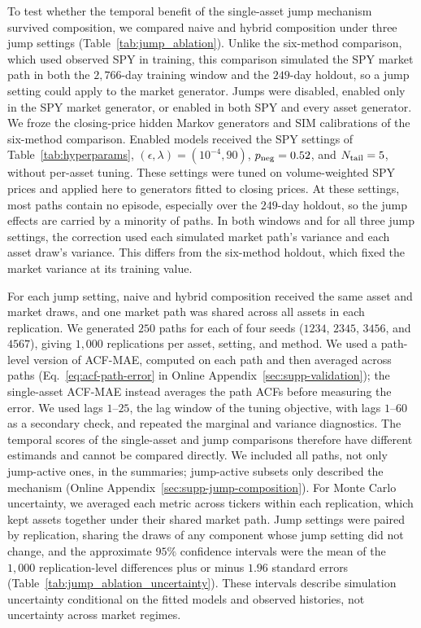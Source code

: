To test whether the temporal benefit of the single-asset jump
mechanism survived composition, we compared naive and hybrid
composition under three jump settings (Table~\ref{tab:jump_ablation}).
Unlike the six-method comparison, which used observed SPY in
training, this comparison simulated the SPY market path in both the
$2{,}766$-day training window and the $249$-day holdout, so a jump
setting could apply to the market generator. Jumps were disabled,
enabled only in the SPY market generator, or enabled in both SPY and
every asset generator. We froze the closing-price hidden Markov generators and SIM
calibrations of the six-method comparison. Enabled models
received the SPY settings of Table~\ref{tab:hyperparams},
$(\epsilon,\lambda)=(10^{-4},90)$, $p_{\rm neg}=0.52$, and
$N_{\rm tail}=5$, without per-asset tuning. These settings were tuned on volume-weighted SPY prices and applied
here to generators fitted to closing prices. At these settings,
most paths contain no episode, especially over the $249$-day holdout,
so the jump effects are carried by a minority of paths. In both windows and for all three jump settings, the correction used
each simulated market path's variance and each asset draw's variance.
This differs from the six-method holdout, which fixed the market
variance at its training value.

For each jump setting, naive and hybrid composition received the same
asset and market draws, and one market path was
shared across all assets in each replication. We generated $250$
paths for each of four seeds ($1234$, $2345$, $3456$, and $4567$),
giving $1{,}000$ replications per asset, setting, and method. We used a path-level version of ACF-MAE, computed on each path and
then averaged across paths (Eq.~\eqref{eq:acf-path-error} in Online
Appendix~\ref{sec:supp-validation}); the single-asset ACF-MAE instead
averages the path ACFs before measuring the error. We used
lags $1$--$25$, the lag window of the tuning objective, with lags
$1$--$60$ as a secondary check, and repeated the marginal and variance
diagnostics. The temporal scores of the single-asset and jump comparisons
therefore have different estimands and cannot be compared directly. We included all paths, not only jump-active ones, in the summaries;
jump-active subsets only described the mechanism
(Online Appendix~\ref{sec:supp-jump-composition}). For Monte Carlo uncertainty, we averaged each metric across tickers
within each replication, which kept assets together under their
shared market path. Jump settings were paired by replication, sharing
the draws of any component whose jump setting did not change, and the
approximate $95\%$ confidence intervals were the mean of the $1{,}000$
replication-level differences plus or minus $1.96$ standard errors
(Table~\ref{tab:jump_ablation_uncertainty}). These intervals describe simulation
uncertainty conditional on the fitted models and observed histories,
not uncertainty across market regimes.
